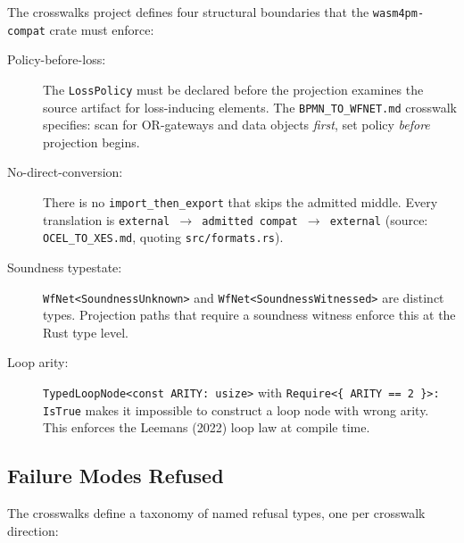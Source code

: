 The crosswalks project defines four structural boundaries that the \texttt{wasm4pm-compat} crate
must enforce:

\begin{description}
  \item[Policy-before-loss:] The \texttt{LossPolicy} must be declared before the projection
    examines the source artifact for loss-inducing elements. The \texttt{BPMN\_TO\_WFNET.md}
    crosswalk specifies: scan for \textsc{OR}-gateways and data objects \emph{first}, set policy
    \emph{before} projection begins.
  \item[No-direct-conversion:] There is no \texttt{import\_then\_export} that skips the admitted
    middle. Every translation is \texttt{external $\to$ admitted compat $\to$ external}
    (source: \texttt{OCEL\_TO\_XES.md}, quoting \texttt{src/formats.rs}).
  \item[Soundness typestate:] \texttt{WfNet<SoundnessUnknown>} and \texttt{WfNet<SoundnessWitnessed>}
    are distinct types. Projection paths that require a soundness witness enforce this at the Rust
    type level.
  \item[Loop arity:] \texttt{TypedLoopNode<const ARITY: usize>} with
    \texttt{Require<\{ ARITY == 2 \}>: IsTrue} makes it impossible to construct a loop node with
    wrong arity. This enforces the Leemans (2022) loop law at compile time.
\end{description}

\subsection{Failure Modes Refused}
\label{sec:crosswalks-arch-failures}

The crosswalks define a taxonomy of named refusal types, one per crosswalk direction:

